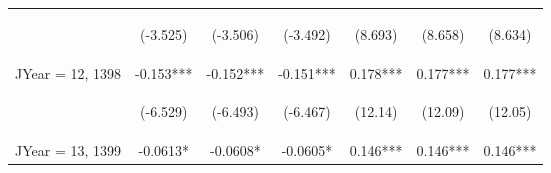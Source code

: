 \documentclass[]{article}
\begin{document}
\begin{center}
\begin{tabular}{lcccccc}
        \vspace{4pt}     & \begin{footnotesize}(-3.525)\end{footnotesize} & \begin{footnotesize}(-3.506)\end{footnotesize} & \begin{footnotesize}(-3.492)\end{footnotesize} & \begin{footnotesize}(8.693)\end{footnotesize}  & \begin{footnotesize}(8.658)\end{footnotesize}  & \begin{footnotesize}(8.634)\end{footnotesize}  \\
        JYear = 12, 1398 & -0.153***                                      & -0.152***                                      & -0.151***                                      & 0.178***                                       & 0.177***                                       & 0.177***                                       \\
        \vspace{4pt}     & \begin{footnotesize}(-6.529)\end{footnotesize} & \begin{footnotesize}(-6.493)\end{footnotesize} & \begin{footnotesize}(-6.467)\end{footnotesize} & \begin{footnotesize}(12.14)\end{footnotesize}  & \begin{footnotesize}(12.09)\end{footnotesize}  & \begin{footnotesize}(12.05)\end{footnotesize}  \\
        JYear = 13, 1399 & -0.0613*                                       & -0.0608*                                       & -0.0605*                                       & 0.146***                                       & 0.146***                                       & 0.146***                                       \\

\end{tabular}
\end{center}
\end{document}
